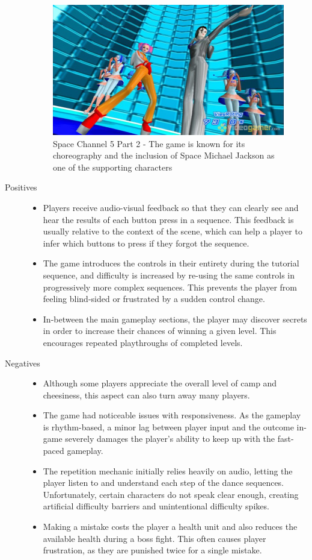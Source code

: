 \begin{description}
{\begin{figure}[htb]
	\centering\includegraphics[width=.25\linewidth]{images/game_sc5}
	\caption{Space Channel 5 Part 2 - The game is known for its choreography and the inclusion of Space Michael Jackson as one of the supporting characters}
	\label{fig:space_channel_five}
\end{figure}}
\item[Positives]{
\begin{itemize}
\item{Players receive audio-visual feedback so that they can clearly see and hear the results of each button press in a sequence. This feedback is usually relative to the context of the scene, which can help a player to infer which buttons to press if they forgot the sequence.}
\item{The game introduces the controls in their entirety during the tutorial sequence, and difficulty is increased by re-using the same controls in progressively more complex sequences. This prevents the player from feeling blind-sided or frustrated by a sudden control change.}
\item{In-between the main gameplay sections, the player may discover secrets in order to increase their chances of winning a given level. This encourages repeated playthroughs of completed levels.}
\end{itemize}
}
\item[Negatives]{
\begin{itemize}
\item{Although some players appreciate the overall level of camp and cheesiness, this aspect can also turn away many players.}
\item{The game had noticeable issues with responsiveness. As the gameplay is rhythm-based, a minor lag between player input and the outcome in-game severely damages the player's ability to keep up with the fast-paced gameplay.}
\item{The repetition mechanic initially relies heavily on audio, letting the player listen to and understand each step of the dance sequences. Unfortunately, certain characters do not speak clear enough, creating artificial difficulty barriers and unintentional difficulty spikes.}
\item{Making a mistake costs the player a health unit and also reduces the available health during a boss fight. This often causes player frustration, as they are punished twice for a single mistake.}

\end{itemize}}
\end{description}

